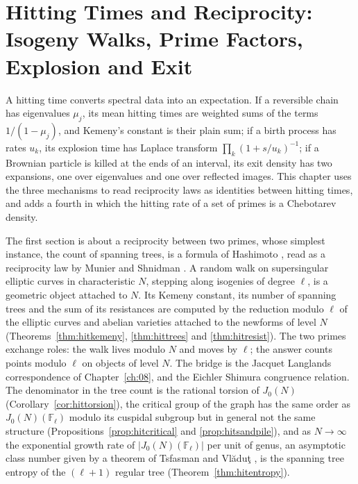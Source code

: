 \chapter[Hitting Times and Reciprocity]{Hitting Times and Reciprocity:\\ Isogeny Walks, Prime Factors,\\ Explosion and Exit}\label{ch:hit}

A hitting time converts spectral data into an expectation. If a reversible chain has eigenvalues $\mu_j$, its mean hitting times are weighted sums of the terms $1/(1-\mu_j)$, and Kemeny's constant is their plain sum; if a birth process has rates $u_k$, its explosion time has Laplace transform $\prod_k(1+s/u_k)^{-1}$; if a Brownian particle is killed at the ends of an interval, its exit density has two expansions, one over eigenvalues and one over reflected images. This chapter uses the three mechanisms to read reciprocity laws as identities between hitting times, and adds a fourth in which the hitting rate of a set of primes is a Chebotarev density.

The first section is about a reciprocity between two primes, whose simplest instance, the count of spanning trees, is a formula of Hashimoto \cite{hashimoto1989,li2019}, read as a reciprocity law by Munier and Shnidman \cite{muniershnidman2023}. A random walk on supersingular elliptic curves in characteristic $N$, stepping along isogenies of degree $\ell$, is a geometric object attached to $N$. Its Kemeny constant, its number of spanning trees and the sum of its resistances are computed by the reduction modulo $\ell$ of the elliptic curves and abelian varieties attached to the newforms of level $N$ (Theorems~\ref{thm:hitkemeny}, \ref{thm:hittrees} and \ref{thm:hitresist}). The two primes exchange roles: the walk lives modulo $N$ and moves by $\ell$; the answer counts points modulo $\ell$ on objects of level $N$. The bridge is the Jacquet Langlands correspondence of Chapter~\ref{ch:08}, and the Eichler Shimura congruence relation. The denominator in the tree count is the rational torsion of $J_0(N)$ (Corollary~\ref{cor:hittorsion}), the critical group of the graph has the same order as $J_0(N)(\mathbb F_\ell)$ modulo its cuspidal subgroup but in general not the same structure (Propositions~\ref{prop:hitcritical} and \ref{prop:hitsandpile}), and as $N\to\infty$ the exponential growth rate of $|J_0(N)(\mathbb F_\ell)|$ per unit of genus, an asymptotic class number given by a theorem of Tsfasman and Vl\u{a}du\c{t} \cite{tsfasmanvladut2002}, is the spanning tree entropy of the $(\ell+1)$ regular tree (Theorem~\ref{thm:hitentropy}).

